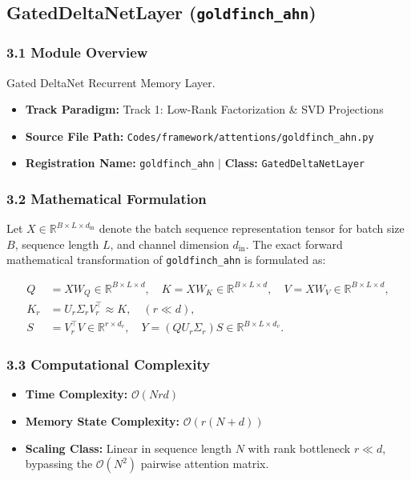 \subsection{GatedDeltaNetLayer (\texttt{goldfinch\_ahn})}
\label{sec:app_module_goldfinch_ahn}

\subsubsection*{3.1 Module Overview}
Gated DeltaNet Recurrent Memory Layer.
\begin{itemize}
    \item \textbf{Track Paradigm:} Track 1: Low-Rank Factorization \& SVD Projections
    \item \textbf{Source File Path:} \texttt{Codes/framework/attentions/goldfinch\_ahn.py}
    \item \textbf{Registration Name:} \texttt{goldfinch\_ahn} $\mid$ \textbf{Class:} \texttt{GatedDeltaNetLayer}
\end{itemize}

\subsubsection*{3.2 Mathematical Formulation}
Let $X \in \mathbb{R}^{B \times L \times d_{\text{in}}}$ denote the batch sequence representation tensor for batch size $B$, sequence length $L$, and channel dimension $d_{\text{in}}$. The exact forward mathematical transformation of \texttt{goldfinch\_ahn} is formulated as:

\begin{align}
Q &= X W_Q \in \mathbb{R}^{B \times L \times d}, \quad K = X W_K \in \mathbb{R}^{B \times L \times d}, \quad V = X W_V \in \mathbb{R}^{B \times L \times d}, \\
K_r &= U_r \Sigma_r V_r^\top \approx K, \quad (r \ll d), \\
S &= V_r^\top V \in \mathbb{R}^{r \times d_v}, \quad Y = (Q U_r \Sigma_r) S \in \mathbb{R}^{B \times L \times d_v}.
\end{align}


\subsubsection*{3.3 Computational Complexity}
\begin{itemize}
    \item \textbf{Time Complexity:} $\mathcal{O}(N r d)$
    \item \textbf{Memory State Complexity:} $\mathcal{O}(r(N + d))$
    \item \textbf{Scaling Class:} Linear in sequence length $N$ with rank bottleneck $r \ll d$, bypassing the $\mathcal{O}(N^2)$ pairwise attention matrix.
\end{itemize}


